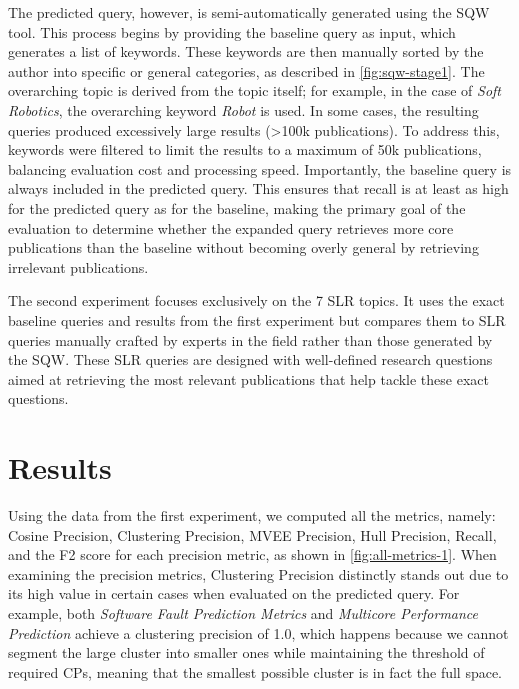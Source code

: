 The predicted query, however, is semi-automatically generated using the SQW tool. This process begins by providing the baseline query as input, which generates a list of keywords. These keywords are then manually sorted by the author into specific or general categories, as described in \autoref{fig:sqw-stage1}. The overarching topic is derived from the topic itself; for example, in the case of \textit{Soft Robotics}, the overarching keyword \textit{Robot} is used. In some cases, the resulting queries produced excessively large results (>100k publications). To address this, keywords were filtered to limit the results to a maximum of 50k publications, balancing evaluation cost and processing speed. Importantly, the baseline query is always included in the predicted query. This ensures that recall is at least as high for the predicted query as for the baseline, making the primary goal of the evaluation to determine whether the expanded query retrieves more core publications than the baseline without becoming overly general by retrieving irrelevant publications.

The second experiment focuses exclusively on the 7 SLR topics. It uses the exact baseline queries and results from the first experiment but compares them to SLR queries manually crafted by experts in the field rather than those generated by the SQW. These SLR queries are designed with well-defined research questions aimed at retrieving the most relevant publications that help tackle these exact questions.

\section{Results}
Using the data from the first experiment, we computed all the metrics, namely: Cosine Precision, Clustering Precision, MVEE Precision, Hull Precision, Recall, and the F2 score for each precision metric, as shown in \autoref{fig:all-metrics-1}. When examining the precision metrics, Clustering Precision distinctly stands out due to its high value in certain cases when evaluated on the predicted query. For example, both \textit{Software Fault Prediction Metrics} and \textit{Multicore Performance Prediction} achieve a clustering precision of 1.0, which happens because we cannot segment the large cluster into smaller ones while maintaining the threshold of required CPs, meaning that the smallest possible cluster is in fact the full space.

